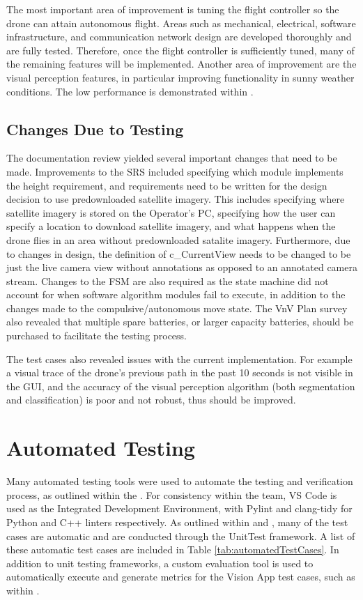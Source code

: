 \documentclass[12pt, titlepage]{article}
\begin{document}
The most important area of improvement is tuning the flight controller so the drone can attain autonomous flight. Areas such as mechanical, electrical, software infrastructure, and communication network design are developed thoroughly and are fully tested. Therefore, once the flight controller is sufficiently tuned, many of the remaining features will be implemented. Another area of improvement are the visual perception features, in particular improving functionality in sunny weather conditions. The low performance is demonstrated within .

\subsection{Changes Due to Testing}
\label{subsec:changesFromTesting}

The documentation review yielded several important changes that need to be made. Improvements to the SRS included specifying which module implements the height requirement, and requirements need to be written for the design decision to use predownloaded satellite imagery. This includes specifying where satellite imagery is stored on the Operator's PC, specifying how the user can specify a location to download satellite imagery, and what happens when the drone flies in an area without predownloaded satalite imagery. Furthermore, due to changes in design, the definition of c\_CurrentView needs to be changed to be just the live camera view without annotations as opposed to an annotated camera stream. Changes to the FSM are also required as the state machine did not account for when software algorithm modules fail to execute, in addition to the changes made to the compulsive/autonomous move state. The VnV Plan survey also revealed that multiple spare batteries, or larger capacity batteries, should be purchased to facilitate the testing process.

The test cases also revealed issues with the current implementation. For example a visual trace of the drone's previous path in the past 10 seconds is not visible in the GUI, and the accuracy of the visual perception algorithm (both segmentation and classification) is poor and not robust, thus should be improved.

\section{Automated Testing}

Many automated testing tools were used to automate the testing and verification process, as outlined within the . For consistency within the team, VS Code is used as the Integrated Development Environment, with Pylint and clang-tidy for Python and C++ linters respectively. As outlined within  and , many of the test cases are automatic and are conducted through the UnitTest framework. A list of these automatic test cases are included in Table \ref{tab:automatedTestCases}. In addition to unit testing frameworks, a custom evaluation tool is used to automatically execute and generate metrics for the Vision App test cases, such as within . 
\end{document}
